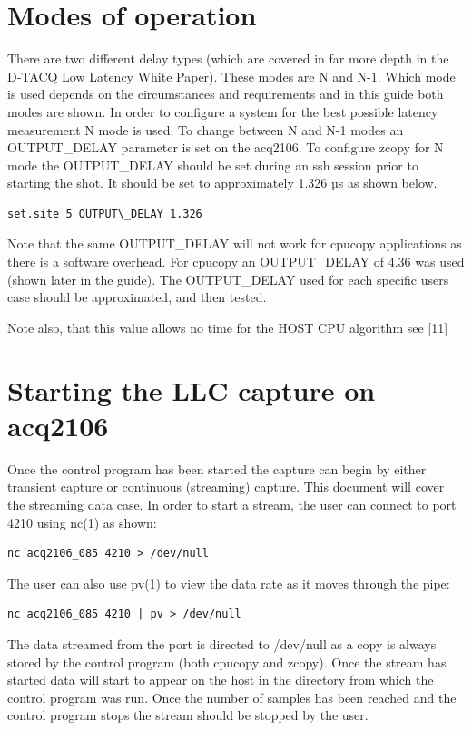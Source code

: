 \documentclass{article}
\begin{document}
\section{Modes of operation}

There are two different delay types (which are covered in far more depth in the D‑TACQ Low Latency White Paper).
These modes are N and N-1.
Which mode is used depends on the circumstances and requirements and in this guide both modes are shown.
In order to configure a system for the best possible latency measurement N mode is used. To change between N and N-1 modes an OUTPUT\_DELAY parameter is set on the acq2106.
To configure zcopy for N mode the OUTPUT\_DELAY should be set during an ssh session prior to starting the shot.
It should be set to approximately 1.326 µs as shown below.

\begin{verbatim}
set.site 5 OUTPUT\_DELAY 1.326
\end{verbatim}

Note that the same OUTPUT\_DELAY will not work for cpucopy applications as there is a software overhead.
For cpucopy an OUTPUT\_DELAY of 4.36 was used (shown later in the guide).
The OUTPUT\_DELAY used for each specific users case should be approximated, and then tested.

Note also, that this value allows no time for the HOST CPU algorithm see [11]

\section{Starting the LLC capture on acq2106}
Once the control program has been started the capture can begin by either transient capture or continuous (streaming) capture.
This document will cover the streaming data case.
In order to start a stream, the user can connect to port 4210 using nc(1) as shown:

\begin{verbatim}
nc acq2106_085 4210 > /dev/null
\end{verbatim}

The user can also use pv(1) to view the data rate as it moves through the pipe:

\begin{verbatim}
nc acq2106_085 4210 | pv > /dev/null
\end{verbatim}

The data streamed from the port is directed to /dev/null as a copy is always stored by the control program (both cpucopy and zcopy).
Once the stream has started data will start to appear on the host in the directory from which the control program was run.
Once the number of samples has been reached and the control program stops the stream should be stopped by the user.
\end{document}

